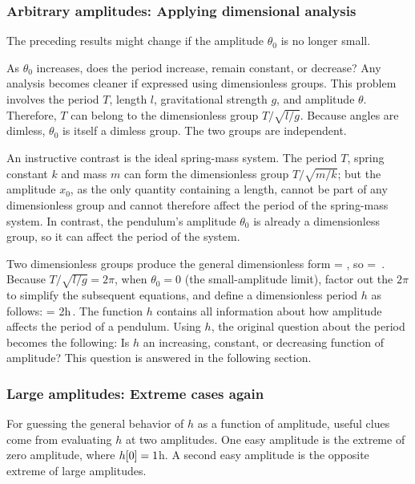 \subsubsection{Arbitrary amplitudes: Applying dimensional analysis}
The preceding results might change if the amplitude $\theta_0$ is no longer small. 

As $\theta_0$ increases, does the period increase, remain constant, or decrease? Any analysis becomes cleaner if expressed using dimensionless groups. This problem involves the period $T$, length $l$, gravitational strength $g$, and amplitude $\theta$. Therefore, $T$ can belong to the dimensionless group $T/\sqrt{l/g}$. Because angles are dimless, $\theta_0$ is itself a dimless group. The two groups are independent.

An instructive contrast is the ideal spring-mass system. The period $T$, spring constant $k$ and mass $m$ can form the dimensionless group $T/\sqrt{m/k}$; but the amplitude $x_0$, as the only quantity containing a length, cannot be part of any dimensionless group and cannot therefore affect the period of the spring-mass system. In contrast, the pendulum's amplitude $\theta_0$ is already a dimensionless group, so it can affect the period of the system.

Two dimensionless groups produce the general dimensionless form
\beq
{} = ,
\eeq
so
\beq
{} = \,.
\eeq
Because $T/\sqrt{l/g} = 2\pi$, when $\theta_0 = 0$ (the small-amplitude limit), factor out the $2\pi$ to simplify the subsequent equations, and define a dimensionless period $h$ as follows:
\beq
{} = 2\pi h\,.
\eeq
The function $h$ contains all information about how amplitude affects the period of a pendulum. Using $h$, the original question about the period becomes the following: Is $h$ an increasing, constant, or decreasing function of amplitude? This question is answered in the following section.


\subsubsection{Large amplitudes: Extreme cases again}
For guessing the general behavior of $h$ as a function of amplitude, useful clues come from evaluating $h$ at two amplitudes. One easy amplitude is the extreme of zero amplitude, where $h\!\left[{0}\right] = 1$h. A second easy amplitude is the opposite extreme of large amplitudes.

